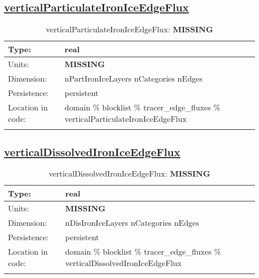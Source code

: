 \subsection[verticalParticulateIronIceEdgeFlux]{\hyperref[sec:var_tab_tracer_edge_fluxes]{verticalParticulateIronIceEdgeFlux}}
\label{subsec:var_sec_tracer_edge_fluxes_verticalParticulateIronIceEdgeFlux}
\begin{center}
\begin{longtable}{| p{2.0in} | p{4.0in} |}
        \hline 
        Type: & real \\
        \hline 
        Units: & {\bf \color{red} MISSING} \\
        \hline 
        Dimension: & nPartIronIceLayers nCategories nEdges \\
        \hline 
        Persistence: & persistent \\
        \hline 
         Location in code: & domain \% blocklist \% tracer\_edge\_fluxes \% verticalParticulateIronIceEdgeFlux \\
         \hline 
    \caption{verticalParticulateIronIceEdgeFlux: {\bf \color{red} MISSING}}
\end{longtable}
\end{center}
\subsection[verticalDissolvedIronIceEdgeFlux]{\hyperref[sec:var_tab_tracer_edge_fluxes]{verticalDissolvedIronIceEdgeFlux}}
\label{subsec:var_sec_tracer_edge_fluxes_verticalDissolvedIronIceEdgeFlux}
\begin{center}
\begin{longtable}{| p{2.0in} | p{4.0in} |}
        \hline 
        Type: & real \\
        \hline 
        Units: & {\bf \color{red} MISSING} \\
        \hline 
        Dimension: & nDisIronIceLayers nCategories nEdges \\
        \hline 
        Persistence: & persistent \\
        \hline 
         Location in code: & domain \% blocklist \% tracer\_edge\_fluxes \% verticalDissolvedIronIceEdgeFlux \\
         \hline 
    \caption{verticalDissolvedIronIceEdgeFlux: {\bf \color{red} MISSING}}
\end{longtable}
\end{center}
